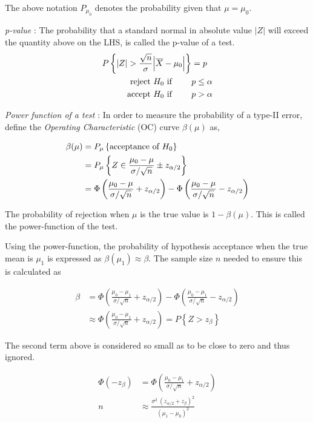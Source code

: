 The above notation $ P_{\mu_0} $ denotes the probability given that $ \mu = \mu_0 $.

\textit{p-value} : The probability that a standard normal in absolute value $ |Z| $ will exceed the quantity above on the LHS, is called the p-value of a test.
\begin{align}
	P \left\{ |Z| > \frac{\sqrt{n}}{\sigma} \Big| \overline{X} - \mu_0 \Big| \right\} &= p \nonumber \\
	\text{reject $ H_0 $ if } \qquad & p \leq \alpha \nonumber \\
	\text{accept $ H_0 $ if } \qquad & p > \alpha	
\end{align}

\textit{Power function of a test} : In order to measure the probability of a type-II error, define the \textit{Operating Characteristic} (OC) curve $ \beta(\mu) $ as,

\begin{align}
	\beta(\mu) &= P_{\mu} \left\{\text{acceptance of $ H_0 $}\right\} \\
	&= P_{\mu} \left\{ Z \in \frac{\mu_0 - \mu}{\sigma/\sqrt{n}} \pm z_{\alpha/2} \right\} \nonumber \\
	&= \Phi\left(\frac{\mu_0 - \mu}{\sigma/\sqrt{n}} + z_{\alpha/2}\right) - \Phi\left( \frac{\mu_0 - \mu}{\sigma/\sqrt{n}} - z_{\alpha/2} \right)
\end{align}

The probability of rejection when $ \mu $ is the true value is $ 1 - \beta(\mu) $. This is called the power-function of the test.

Using the power-function, the probability of hypothesis acceptance when the true mean is $ \mu_1 $ is expressed as $ \beta(\mu_1) \approx \beta $. The sample size $ n $ needed to ensure this is calculated as

\begin{align}
	\beta &= \Phi\left(\frac{\mu_0 - \mu_1}{\sigma/\sqrt{n}} + z_{\alpha/2}\right) - \Phi\left( \frac{\mu_0 - \mu_1}{\sigma/\sqrt{n}} - z_{\alpha/2} \right) \nonumber \\
	&\approx \Phi\left(\frac{\mu_0 - \mu_1}{\sigma/\sqrt{n}} + z_{\alpha/2}\right) = P\left\{Z > z_\beta\right\}\nonumber
\end{align}

The second term above is considered so small as to be close to zero and thus ignored.

\begin{align}
	\Phi(-z_\beta) &= \Phi\left(\frac{\mu_0 - \mu_1}{\sigma/\sqrt{n}} + z_{\alpha/2}\right) \nonumber \\
	n &\approx \frac{\sigma^2\ (z_{\alpha/2} + z_\beta)^2}{(\mu_1 - \mu_0)^2}
\end{align}

